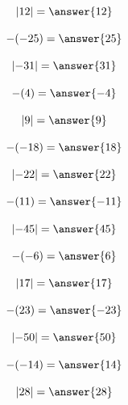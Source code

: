 \documentclass{ximera}
\begin{document}
\begin{problem}
\[
\left| 12 \right| = \answer{12}
\]
\end{problem}

\begin{problem}
\[
-(-25) = \answer{25}
\]
\end{problem}

\begin{problem}
\[
\left| -31 \right| = \answer{31}
\]
\end{problem}

\begin{problem}
\[
-(4) = \answer{-4}
\]
\end{problem}

\begin{problem}
\[
\left| 9 \right| = \answer{9}
\]
\end{problem}

\begin{problem}
\[
-(-18) = \answer{18}
\]
\end{problem}

\begin{problem}
\[
\left| -22 \right| = \answer{22}
\]
\end{problem}

\begin{problem}
\[
-(11) = \answer{-11}
\]
\end{problem}

\begin{problem}
\[
\left| -45 \right| = \answer{45}
\]
\end{problem}

\begin{problem}
\[
-(-6) = \answer{6}
\]
\end{problem}

\begin{problem}
\[
\left| 17 \right| = \answer{17}
\]
\end{problem}

\begin{problem}
\[
-(23) = \answer{-23}
\]
\end{problem}

\begin{problem}
\[
\left| -50 \right| = \answer{50}
\]
\end{problem}

\begin{problem}
\[
-(-14) = \answer{14}
\]
\end{problem}

\begin{problem}
\[
\left| 28 \right| = \answer{28}
\]
\end{problem}
\end{document}
